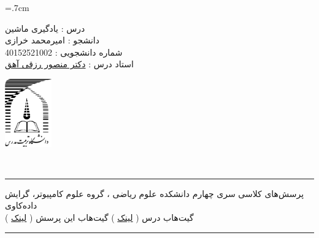 \documentclass[a4paper, 12pt]{article}
\begin{document}
	
\noindent
\begin{minipage}[c]{5cm}
	\baselineskip=.7cm
	\begin{flushright}
		درس : یادگیری ماشین 
		\\
		دانشجو :
		امیرمحمد خرازی
		\\
		شماره دانشجویی :
		40152521002 
		\\
		استاد درس :  
		\href{mrezghi.ir}{دکتر منصور رزقی آهق}
	\end{flushright}
\end{minipage}
\hfill
\begin{minipage}[c]{3cm}
	\begin{center}
		\href{modares.ac.ir}{
			\includegraphics[width=2cm]{logo.png}}
	\end{center}	
\end{minipage}
\\[1mm]
\hrule depth .5mm \relax
\begin{flushright}
	پرسش‌های کلاسی سری چهارم
	\hfill
	دانشکده علوم ریاضی ، گروه علوم کامپیوتر، گرایش داده‌کاوی
	\\
	\vspace{5mm}
	گیت‌هاب درس (
	\href{https://github.com/A-M-Kharazi/Machine-Learning-TMU.git}{لینک}
	)
	\hfill
	گیت‌هاب این پرسش (
	\href{https://github.com/A-M-Kharazi/Machine-Learning-TMU/tree/main/Questions/Q-Series4}{لینک}
	)
\end{flushright}

\hrule depth .5mm\relax

\end{document}
